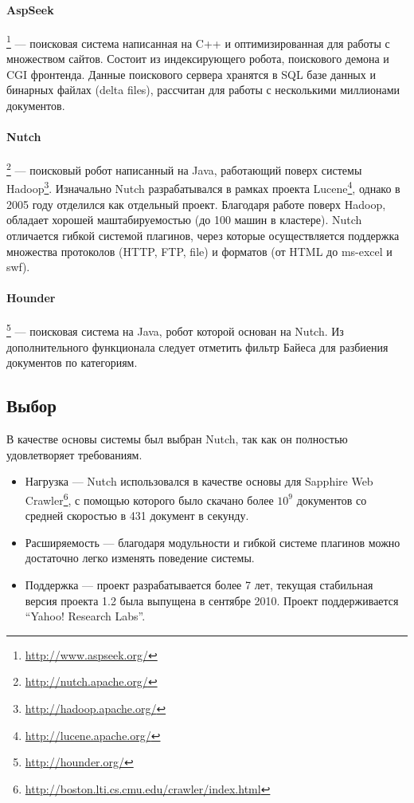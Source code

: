 \paragraph{AspSeek}\footnote{\href{http://www.aspseek.org/}{http://www.aspseek.org/}} --- поисковая система написанная на C++ и оптимизированная для работы с множеством сайтов. Состоит из индексирующего робота, поискового демона и CGI фронтенда. Данные поискового сервера хранятся в SQL базе данных и бинарных файлах (delta files), рассчитан для работы с несколькими миллионами документов.
\paragraph{Nutch}\footnote{\href{http://nutch.apache.org/}{http://nutch.apache.org/}} --- поисковый робот написанный на Java, работающий поверх системы Hadoop\footnote{\href{http://hadoop.apache.org/}{http://hadoop.apache.org/}}. Изначально Nutch разрабатывался в рамках проекта Lucene\footnote{\href{http://lucene.apache.org/}{http://lucene.apache.org/}}, однако в 2005 году отделился как отдельный проект. Благодаря работе поверх Hadoop, обладает хорошей маштабируемостью (до 100 машин в кластере). Nutch отличается гибкой системой плагинов, через которые осуществляется поддержка множества протоколов (HTTP, FTP, file) и форматов (от HTML до ms-excel и swf).
\paragraph{Hounder}\footnote{\href{http://hounder.org/}{http://hounder.org/}} --- поисковая система на Java, робот которой основан на Nutch. Из дополнительного функционала следует отметить фильтр Байеса для разбиения документов по категориям.

\subsection{Выбор}
В качестве основы системы был выбран Nutch, так как он полностью удовлетворяет требованиям.
\begin{itemize}
 \item Нагрузка --- Nutch использовался в качестве основы для Sapphire Web Crawler\footnote{\href{http://boston.lti.cs.cmu.edu/crawler/index.html}{http://boston.lti.cs.cmu.edu/crawler/index.html}}, с помощью которого было скачано более $10^{9}$ документов со средней скоростью в 431 документ в секунду.
 \item Расширяемость --- благодаря модульности и гибкой системе плагинов можно достаточно легко изменять поведение системы.
 \item Поддержка --- проект разрабатывается более 7 лет, текущая стабильная версия проекта 1.2 была выпущена в сентябре 2010. Проект поддерживается ``Yahoo! Research Labs''.
\end{itemize}

